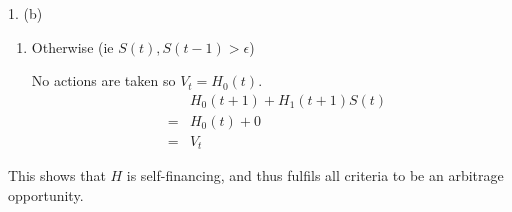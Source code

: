 \documentclass[11pt,a4paper]{article}
\begin{document}
\begin{answer}{1. (b)}
\begin{enumerate}
    \item Otherwise (ie $S(t),S(t-1)>\epsilon$)
    \par No actions are taken so $V_t=H_0(t)$.
    \[\begin{array}{rcl}
      &&H_0(t+1)+H_1(t+1)S(t)\\
      &=&H_0(t)+0\\
      &=&V_t
    \end{array}\]
  \end{enumerate}
  This shows that $H$ is self-financing, and thus fulfils all criteria to be an arbitrage opportunity.
\end{answer}
\end{document}
